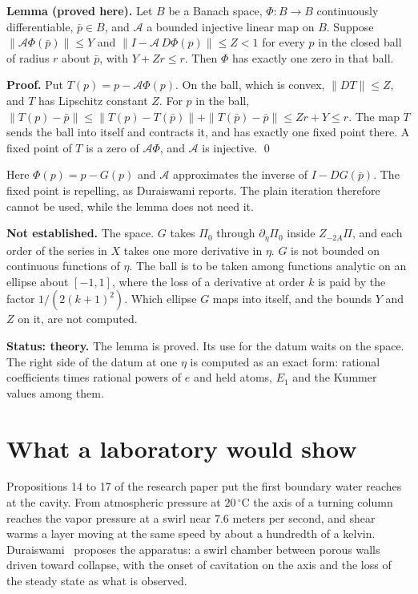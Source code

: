 \textbf{Lemma (proved here).} Let $B$ be a Banach space, $\Phi : B \to B$ continuously
differentiable, $\bar p \in B$, and $\mathcal{A}$ a bounded injective linear map on $B$. Suppose
$\|\mathcal{A}\Phi(\bar p)\| \le Y$ and $\|I - \mathcal{A}\,D\Phi(p)\| \le Z < 1$ for every $p$ in
the closed ball of radius $r$ about $\bar p$, with $Y + Zr \le r$. Then $\Phi$ has exactly one
zero in that ball.

\textbf{Proof.} Put $T(p) = p - \mathcal{A}\Phi(p)$. On the ball, which is convex,
$\|DT\| \le Z$, and $T$ has Lipschitz constant $Z$. For $p$ in the ball,
$\|T(p) - \bar p\| \le \|T(p) - T(\bar p)\| + \|T(\bar p) - \bar p\| \le Zr + Y \le r$. The map $T$
sends the ball into itself and contracts it, and has exactly one fixed point there. A fixed point
of $T$ is a zero of $\mathcal{A}\Phi$, and $\mathcal{A}$ is injective. \qed

Here $\Phi(p) = p - G(p)$ and $\mathcal{A}$ approximates the inverse of $I - DG(\bar p)$. The
fixed point is repelling, as Duraiswami reports. The plain iteration therefore cannot be used,
while the lemma does not need it.

\textbf{Not established.} The space. $G$ takes $\Pi_0$ through $\partial_\eta\Pi_0$ inside
$Z_{-2A}\Pi$, and each order of the series in $X$ takes one more derivative in $\eta$. $G$ is not
bounded on continuous functions of $\eta$. The ball is to be taken among functions analytic on an
ellipse about $[-1,1]$, where the loss of a derivative at order $k$ is paid by the factor
$1/(2(k+1)^2)$. Which ellipse $G$ maps into itself, and the bounds $Y$ and $Z$ on it, are not
computed.

\textbf{Status: theory.} The lemma is proved. Its use for the datum waits on the space. The
right side of the datum at one $\eta$ is computed as an exact form: rational coefficients times
rational powers of $e$ and held atoms, $E_1$ and the Kummer values among them.

\section{What a laboratory would show}

Propositions 14 to 17 of the research paper put the first boundary water reaches at the cavity.
From atmospheric pressure at $20\,^\circ$C the axis of a turning column reaches the vapor pressure
at a swirl near $7.6$ meters per second, and shear warms a layer moving at the same speed by about
a hundredth of a kelvin. Duraiswami~\cite{src:Duraiswami-2026} proposes the apparatus: a swirl
chamber between porous walls driven toward collapse, with the onset of cavitation on the axis and
the loss of the steady state as what is observed.

